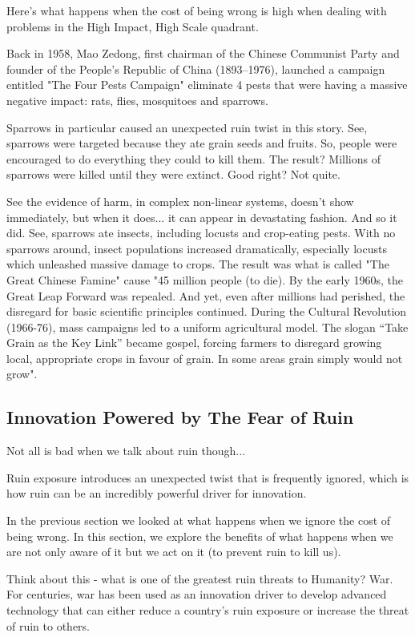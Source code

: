 Here's what happens when the cost of being wrong is high when dealing with problems in the High Impact, High Scale quadrant.

Back in 1958, Mao Zedong, first chairman of the Chinese Communist Party and founder of the People's Republic of China (1893–1976), launched a campaign entitled "The Four Pests Campaign" eliminate 4 pests that were having a massive negative impact: rats, flies, mosquitoes and sparrows.

Sparrows in particular caused an unexpected ruin twist in this story. See, sparrows were targeted because they ate grain seeds and fruits. So, people were encouraged to do everything they could to kill them. The result? Millions of sparrows were killed until they were extinct. Good right? Not quite. 

See the evidence of harm, in complex non-linear systems, doesn't show immediately, but when it does... it can appear in devastating fashion. And so it did. See, sparrows ate insects, including locusts and crop-eating pests. With no sparrows around, insect populations increased dramatically, especially locusts which unleashed massive damage to crops. The result was what is called "The Great Chinese Famine" cause "45 million people (to die). By the early 1960s, the Great Leap Forward was repealed. And yet, even after millions had perished, the disregard for basic scientific principles continued. During the Cultural Revolution (1966-76), mass campaigns led to a uniform agricultural model. The slogan “Take Grain as the Key Link” became gospel, forcing farmers to disregard growing local, appropriate crops in favour of grain. In some areas grain simply would not grow". \cite{China4Pests}

\subsection{Innovation Powered by The Fear of Ruin}

Not all is bad when we talk about ruin though... 

Ruin exposure introduces an unexpected twist that is frequently ignored, which is how ruin can be an incredibly powerful driver for innovation. 

In the previous section we looked at what happens when we ignore the cost of being wrong. In this section, we explore the benefits of what happens when we are not only aware of it but we act on it (to prevent ruin to kill us).

Think about this - what is one of the greatest ruin threats to Humanity? War. For centuries, war has been used as an innovation driver to develop advanced technology that can either reduce a country's ruin exposure or increase the threat of ruin to others.

